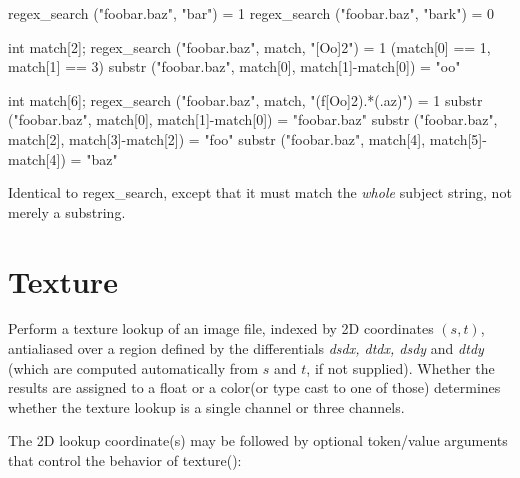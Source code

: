 \documentclass[11pt,letterpaper]{book}
\def\color{{\cf color}\xspace}
\def\float{{\cf float}\xspace}
\begin{document}
\begin{code}
    regex_search ("foobar.baz", "bar")    = 1
    regex_search ("foobar.baz", "bark")   = 0

    int match[2];
    regex_search ("foobar.baz", match, "[Oo]{2}") = 1
                                      (match[0] == 1, match[1] == 3)
    substr ("foobar.baz", match[0], match[1]-match[0]) = "oo"

    int match[6];
    regex_search ("foobar.baz", match, "(f[Oo]{2}).*(.az)") = 1
    substr ("foobar.baz", match[0], match[1]-match[0]) = "foobar.baz"
    substr ("foobar.baz", match[2], match[3]-match[2]) = "foo"
    substr ("foobar.baz", match[4], match[5]-match[4]) = "baz"
\end{code}

\apiend

Identical to {\cf regex_search}, except that it must match the
\emph{whole} {\cf subject} string, not merely a substring.
\apiend




\section{Texture}
\label{sec:stdlib:texture}


Perform a texture lookup of an image file, indexed by 2D coordinates
$(s,t)$, antialiased over a region defined by the differentials
\emph{dsdx, dtdx, dsdy} and \emph{dtdy} (which are computed
automatically from $s$ and $t$, if not supplied).  Whether the results
are assigned to a \float or a \color (or type cast to one of those)
determines whether the texture lookup is a single channel or three
channels.

The 2D lookup coordinate(s) may be followed by optional token/value
arguments that control the behavior of {\cf texture()}:
\end{document}
